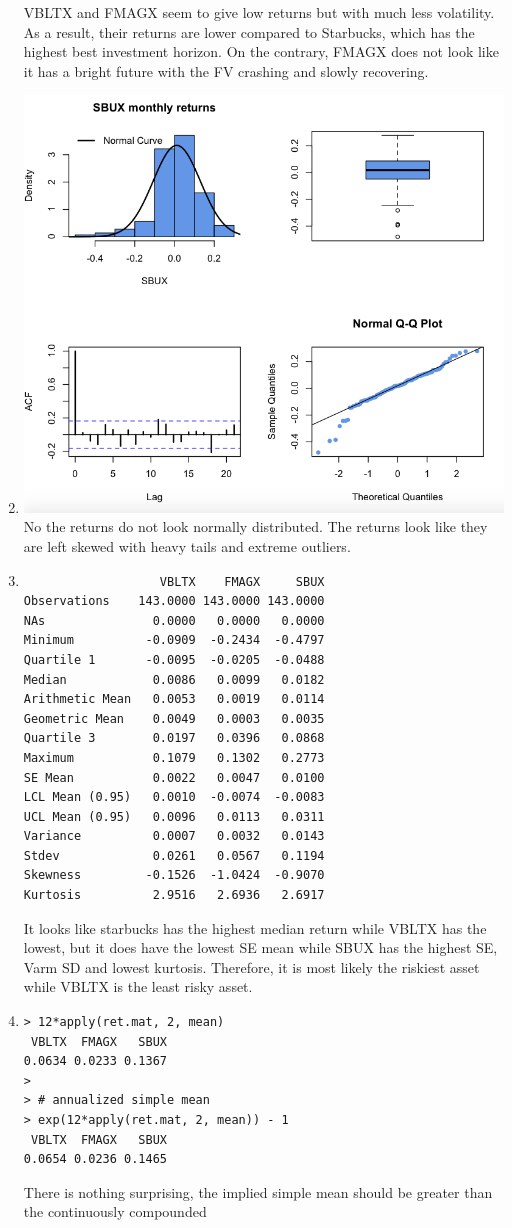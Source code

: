 \documentclass[letterpaper,12pt]{article}
\begin{document}
\begin{enumerate}
VBLTX and FMAGX seem to give low returns but with much less volatility. As a result, their returns are lower compared to Starbucks, which has the highest best investment horizon. On the contrary, FMAGX does not look like it has a bright future with the FV crashing and slowly recovering.
\item \includegraphics[scale = 0.4]{4}
No the returns do not look normally distributed. The returns look like they are left skewed with heavy tails and extreme outliers.
\item \begin{lstlisting}
                   VBLTX    FMAGX     SBUX
Observations    143.0000 143.0000 143.0000
NAs               0.0000   0.0000   0.0000
Minimum          -0.0909  -0.2434  -0.4797
Quartile 1       -0.0095  -0.0205  -0.0488
Median            0.0086   0.0099   0.0182
Arithmetic Mean   0.0053   0.0019   0.0114
Geometric Mean    0.0049   0.0003   0.0035
Quartile 3        0.0197   0.0396   0.0868
Maximum           0.1079   0.1302   0.2773
SE Mean           0.0022   0.0047   0.0100
LCL Mean (0.95)   0.0010  -0.0074  -0.0083
UCL Mean (0.95)   0.0096   0.0113   0.0311
Variance          0.0007   0.0032   0.0143
Stdev             0.0261   0.0567   0.1194
Skewness         -0.1526  -1.0424  -0.9070
Kurtosis          2.9516   2.6936   2.6917
\end{lstlisting}
It looks like starbucks has the highest median return while VBLTX has the lowest, but it does have the lowest SE mean while SBUX has the highest SE, Varm SD and lowest kurtosis. Therefore, it is most likely the riskiest asset while VBLTX is the least risky asset.
\item \begin{lstlisting}
> 12*apply(ret.mat, 2, mean)
 VBLTX  FMAGX   SBUX 
0.0634 0.0233 0.1367 
> 
> # annualized simple mean
> exp(12*apply(ret.mat, 2, mean)) - 1
 VBLTX  FMAGX   SBUX 
0.0654 0.0236 0.1465 
\end{lstlisting}
There is nothing surprising, the implied simple mean should be greater than the continuously compounded 


\end{enumerate}
\end{document}
